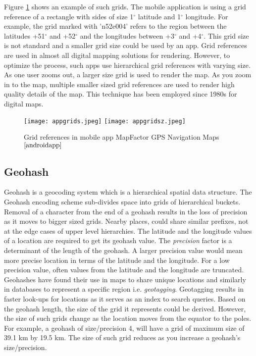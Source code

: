 Figure \ref{fg:appgrid} shows an example of such grids. The mobile application \cite{androidapp} is using a grid reference of a rectangle with sides of size 1$^{\circ}$ latitude and 1$^{\circ}$ longitude. For example, the grid marked with 'n52e004' refers to the region between the latitudes +51$^{\circ}$ and +52$^{\circ}$ and the longitudes between +3$^{\circ}$ and +4$^{\circ}$. This grid size is not standard and a smaller grid size could be used by an app. Grid references are used in almost all digital mapping solutions for rendering. However, to optimize the process, such apps use hierarchical grid references with varying size. As one user zooms out, a larger size grid is used to render the map. As you zoom in to the map, multiple smaller sized grid references are used to render high quality details of the map. This technique has been employed since 1980s for digital maps.
\begin{figure}
\centering 
\texttt{[image: appgrids.jpeg]}
\texttt{[image: appgridsz.jpeg]}
\caption{Grid references in mobile app MapFactor GPS Navigation Maps $\cite{androidapp}$}
\label{fg:appgrid}
\end{figure}
\subsection{Geohash} \label{geohash}
Geohash \cite{suwardi2015geohash} is a geocoding system which is a hierarchical spatial data structure. The Geohash encoding scheme sub-divides space into grids of hierarchical buckets. Removal of a character from the end of a geohash results in the loss of precision as it moves to bigger sized grids. Nearby places, could share similar prefixes, not at the edge cases of upper level hierarchies. The latitude and the longitude values of a location are required to get its geohash value. The \textit{precision} factor is a determinant of the length of the geohash. A larger precision value would mean more precise location in terms of the latitude and the longitude. For a low precision value, often values from the latitude and the longitude are truncated. Geohashes have found their use in maps to share unique locations and similarly in databases to represent a specific region i.e. \textit{geotagging}. Geotagging results in faster look-ups for locations as it serves as an index to search queries. Based on the geohash length, the size of the grid it represents could be derived. However, the size of such grids change as the location moves from the equator to the poles. For example, a geohash of size/precision 4, will have a grid of maximum size of 39.1 km by 19.5 km. The size of such grid reduces as you increase a geohash's size/precision. 

